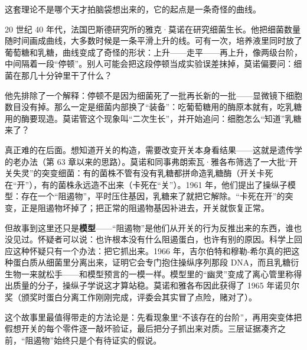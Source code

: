 \begin{zhengju}
这套理论不是哪个天才拍脑袋想出来的，它的起点是一条奇怪的曲线。

20 世纪 40 年代，法国巴斯德研究所的雅克·莫诺在研究细菌生长。他把细菌数量随时间画成曲线，大多数时候是一条平滑上升的线。可有一次，培养液里同时放了葡萄糖和乳糖，曲线变成了奇怪的形状：上升——走平——再上升，像两级台阶，中间隔着一段“停顿”。别人可能会把这段停顿当成实验误差抹掉，莫诺偏要问：细菌在那几十分钟里干了什么？

他先排除了一个解释：停顿不是因为细菌死了一批再长新的一批——显微镜下细胞数目没有掉。那么一定是细菌内部换了“装备”：吃葡萄糖用的酶原本就有，吃乳糖用的酶要现造。莫诺管这个现象叫“二次生长”，并开始追问：细胞怎么“知道”乳糖来了？

真正难的在后面。想知道开关的构造，需要改变开关本身看结果——这就是遗传学的老办法（第 63 章以来的思路）。莫诺和同事弗朗索瓦·雅各布筛选了一大批“开关失灵”的突变细菌：有的菌株不管有没有乳糖都拼命造乳糖酶（开关卡死在“开”），有的菌株永远造不出来（卡死在“关”）。1961 年，他们提出了操纵子模型：存在一个“阻遏物”，平时压住基因，乳糖来了就把它解除。“卡死在开”的突变，正是阻遏物坏掉了；把正常的阻遏物基因补进去，开关就恢复正常。

但故事到这里还只是\textbf{模型}——“阻遏物”是他们从开关的行为反推出来的东西，谁也没见过。怀疑者可以说：也许根本没有什么阻遏蛋白，也许有别的原因。科学上回应这种怀疑只有一个办法：把它抓出来。1966 年，吉尔伯特和穆勒-希尔真的把这种蛋白质从细菌里分离出来，证明它会专门抱住操纵序列那段 DNA，而且乳糖衍生物一来就松手——和模型预言的一模一样。模型里的“幽灵”变成了离心管里称得出质量的分子，操纵子学说这才算站稳。莫诺和雅各布因此获得了 1965 年诺贝尔奖（颁奖时蛋白分离工作刚刚完成，评委会其实冒了点险，赌对了）。

这个故事里最值得带走的方法论是：先看现象里“不该存在的台阶”，再用突变体把假想开关的每个零件逐一敲坏验证，最后把分子抓出来对质。三层证据凑齐之前，“阻遏物”始终只是个有待证实的假说。
\end{zhengju}

